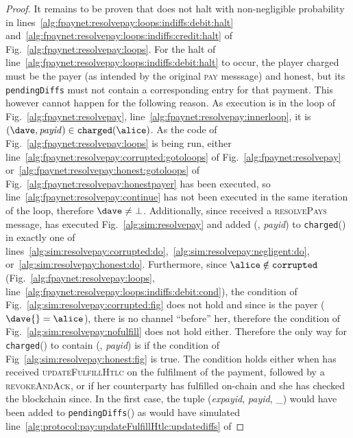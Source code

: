 \begin{proof}
  It remains to be proven that \fpaynet{} does not halt with
  non-negligible probability in
  lines~\ref{alg:fpaynet:resolvepay:loops:indiffs:debit:halt}
  and~\ref{alg:fpaynet:resolvepay:loops:indiffs:credit:halt} of
  Fig.~\ref{alg:fpaynet:resolvepay:loops}. For the halt of
  line~\ref{alg:fpaynet:resolvepay:loops:indiffs:debit:halt} to occur, the
  player charged must be the payer (as intended by the original \textsc{pay}
  messsage) and honest, but its \texttt{pendingDiffs} must not contain a
  corresponding entry for that payment. This however cannot happen for the
  following reason. As execution is in the loop of
  Fig.~\ref{alg:fpaynet:resolvepay},
  line~\ref{alg:fpaynet:resolvepay:innerloop}, it is $(\dave, \mathit{payid})
  \in \mathtt{charged}(\alice)$. As the code of
  Fig.~\ref{alg:fpaynet:resolvepay:loops} is being run, either
  line~\ref{alg:fpaynet:resolvepay:corrupted:gotoloops} of
  Fig.~\ref{alg:fpaynet:resolvepay}
  or~\ref{alg:fpaynet:resolvepay:honest:gotoloops} of
  Fig.~\ref{alg:fpaynet:resolvepay:honestpayer} has been executed, so
  line~\ref{alg:fpaynet:resolvepay:continue} has not been executed in the same
  iteration of the loop, therefore $\dave \neq \bot$. Additionally, since
  \fpaynet{} received a \textsc{resolvePays} message, \simulator{} has executed
  Fig.~\ref{alg:sim:resolvepay} and added (\dave, \textit{payid}) to
  \texttt{charged}(\alice) in exactly one of
  lines~\ref{alg:sim:resolvepay:corrupted:do},~\ref{alg:sim:resolvepay:negligent:do},
  or~\ref{alg:sim:resolvepay:honest:do}. Furthermore, since $\alice \notin
  \mathtt{corrupted}$ (Fig.~\ref{alg:fpaynet:resolvepay:loops},
  line~\ref{alg:fpaynet:resolvepay:loops:indiffs:debit:cond}), the condition of
  Fig.~\ref{alg:sim:resolvepay:corrupted:fig} does not hold and since \alice{}
  is the payer ($\dave{} = \alice$), there is no channel ``before'' her,
  therefore the condition of Fig.~\ref{alg:sim:resolvepay:nofulfill} does not
  hold either. Therefore the only way for \texttt{charged}(\alice) to contain
  (\alice, \textit{payid}) is if the condition of
  Fig~\ref{alg:sim:resolvepay:honest:fig} is true. The condition holds either
  when \alice{} has received \textsc{updateFulfillHtlc} on the fulfilment of the
  payment, followed by a \textsc{revokeAndAck}, or if her counterparty has
  fulfilled on-chain and she has checked the blockchain since. In the first
  case, the tuple (\textit{expayid}, \textit{payid}, \_) would have been added
  to \texttt{pendingDiffs}(\alice) as \simulator{} would have simulated
  line~\ref{alg:protocol:pay:updateFulfillHtlc:updatediffs} of

\end{proof}
